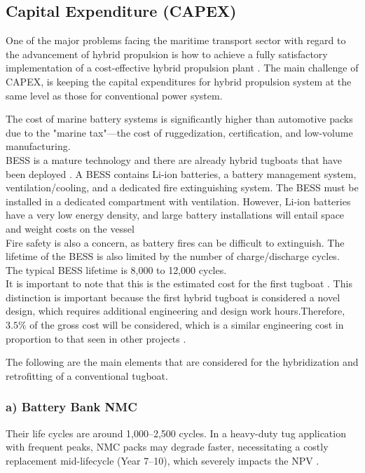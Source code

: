 \subsection{Capital Expenditure (CAPEX)}

One of the major problems facing the maritime transport sector with regard to the advancement of hybrid propulsion is how to achieve a fully satisfactory implementation of a cost-effective hybrid propulsion plant \cite{MAN2}. 
The main challenge of CAPEX, is keeping the capital expenditures for hybrid propulsion system at the same level as those for conventional power system.

The cost of marine battery systems is significantly higher than automotive packs due to the "marine tax"—the cost of ruggedization, certification, and low-volume manufacturing.\\

BESS is a mature technology and there are already hybrid tugboats that have been deployed \cite{CaGov}. A BESS contains Li-ion batteries, a battery management system, ventilation/cooling, and a dedicated fire extinguishing system. The BESS must be installed in a dedicated compartment with ventilation. However, Li-ion batteries have a very low energy density, and large battery installations will entail space and weight costs on the vessel\\ 
Fire safety is also a concern, as battery fires can be difficult to extinguish. The lifetime of the BESS is also limited by the number of charge/discharge cycles. The typical BESS lifetime is 8,000 to 12,000 cycles.\\

It is important to note that this is the estimated cost for the first tugboat \cite{CaGov}. This distinction is important because the first hybrid tugboat is considered a novel design, which requires additional engineering and design work hours.Therefore, $3.5\%$ of the gross cost will be considered, which is a similar engineering cost in proportion to that seen in other projects \cite{CaGov}.

The following are the main elements that are considered for the hybridization and retrofitting of a conventional tugboat.

\subsubsection{a) Battery Bank NMC}

Their life cycles are around 1,000–2,500 cycles. In a heavy-duty tug application with frequent peaks, NMC packs may degrade faster, necessitating a costly replacement mid-lifecycle (Year 7–10), which severely impacts the NPV \cite{ankersolix}.

